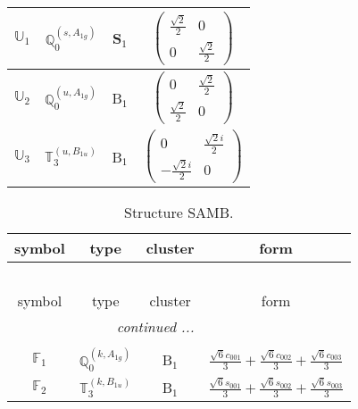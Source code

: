 \documentclass[fleqn,10pt,landscape]{article}
\begin{document}
\begin{itemize}
\begin{center}
\begin{longtable}{c|c|c|c}
$ \mathbb{U}_{1} $ & $\mathbb{Q}_{0}^{(s,A_{1g})}$ & S$_{1}$ & $\begin{pmatrix} \frac{\sqrt{2}}{2} & 0 \\ 0 & \frac{\sqrt{2}}{2} \end{pmatrix}$ \\ \hline
$ \mathbb{U}_{2} $ & $\mathbb{Q}_{0}^{(u,A_{1g})}$ & B$_{1}$ & $\begin{pmatrix} 0 & \frac{\sqrt{2}}{2} \\ \frac{\sqrt{2}}{2} & 0 \end{pmatrix}$ \\
$ \mathbb{U}_{3} $ & $\mathbb{T}_{3}^{(u,B_{1u})}$ & B$_{1}$ & $\begin{pmatrix} 0 & \frac{\sqrt{2} i}{2} \\ - \frac{\sqrt{2} i}{2} & 0 \end{pmatrix}$ \\
\end{longtable}
\end{center}
\begin{center}
\renewcommand{\arraystretch}{1.3}
\begin{longtable}{c|c|c|c}
\caption{Structure SAMB.}
 \\
 \hline \hline
symbol & type & cluster & form \\ \hline \endfirsthead

\multicolumn{3}{l}{\tablename\ \thetable{}} \\
 \hline \hline
symbol & type & cluster & form \\ \hline \endhead

 \hline \hline
\multicolumn{3}{r}{\footnotesize\it continued ...} \\ \endfoot

 \hline \hline
\multicolumn{3}{r}{} \\ \endlastfoot

$ \mathbb{F}_{1} $ & $\mathbb{Q}_{0}^{(k,A_{1g})}$ & B$_{1}$ & $\frac{\sqrt{6} c_{001}}{3} + \frac{\sqrt{6} c_{002}}{3} + \frac{\sqrt{6} c_{003}}{3}$ \\
$ \mathbb{F}_{2} $ & $\mathbb{T}_{3}^{(k,B_{1u})}$ & B$_{1}$ & $\frac{\sqrt{6} s_{001}}{3} + \frac{\sqrt{6} s_{002}}{3} + \frac{\sqrt{6} s_{003}}{3}$ \\
\end{longtable}
\end{center}


\end{itemize}
\end{document}
